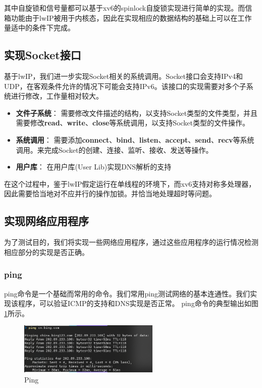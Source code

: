 \documentclass[a4paper,twoside]{article}
\begin{document}
\begin{spacing}{1.2}
\begin{table}[htb]
\begin{tabular}{p{4cm}|c}
	\end{tabular}
\end{table}

其中自旋锁和信号量都可以基于xv6的spinlock自旋锁实现进行简单的实现。而信箱功能由于lwIP被用于内核态，因此在实现相应的数据结构的基础上可以在工作量适中的条件下完成。

\subsection{实现Socket接口}

基于lwIP，我们进一步实现Socket相关的系统调用。Socket接口会支持IPv4和UDP，在客观条件允许的情况下可能会支持IPv6。该接口的实现需要对多个子系统进行修改，工作量相对较大。

\begin{itemize}
	\item \textbf{文件子系统}： 需要修改文件描述的结构，以支持Socket类型的文件类型，并且需要修改\textbf{read}、\textbf{write}、\textbf{close}等系统调用，以支持Socket类型的文件操作。
	\item \textbf{系统调用}： 需要添加\textbf{connect}、\textbf{bind}、\textbf{listen}、\textbf{accept}、\textbf{send}、\textbf{recv}等系统调用。来完成Socket的创建、连接、监听、接收、发送等操作。
	\item \textbf{用户库}： 在用户库(User Lib)实现DNS解析的支持
\end{itemize}

在这个过程中，鉴于lwIP假定运行在单线程的环境下，而xv6支持对称多处理器，因此需要恰当地对不应并行的操作加锁。并恰当地处理超时等问题。

\subsection{实现网络应用程序}

为了测试目的，我们将实现一些网络应用程序，通过这些应用程序的运行情况检测相应部分的实现是否正确。

\subsubsection{ping}

ping命令是一个基础而常用的命令。我们常用ping测试网络的基本连通性。我们实现该程序，可以验证ICMP的支持和DNS实现是否正常。
ping命令的典型输出如图\ref{fig:ping}所示。

\begin{figure}[htb]
	\centering
	\caption{Ping}
	\label{fig:ping}
	\includegraphics[width=0.6\textwidth]{ping.png}
\end{figure}


\end{spacing}
\end{document}

